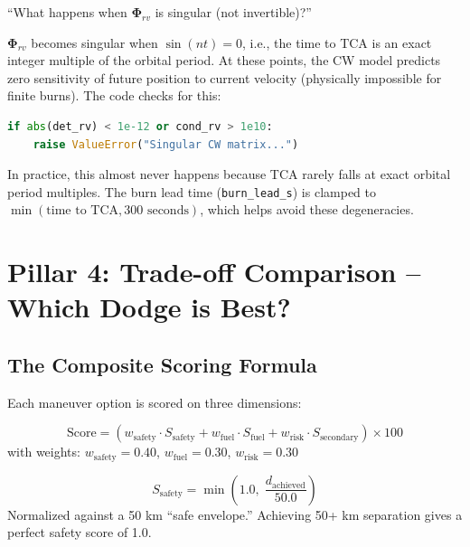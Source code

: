 \documentclass[12pt,a4paper]{article}
\begin{document}
\begin{questionbox}
``What happens when $\boldsymbol{\Phi}_{rv}$ is singular (not invertible)?''
\end{questionbox}
\begin{answerbox}
$\boldsymbol{\Phi}_{rv}$ becomes singular when $\sin(nt) = 0$, i.e., the time to TCA is an exact integer multiple of the orbital period. At these points, the CW model predicts zero sensitivity of future position to current velocity (physically impossible for finite burns). The code checks for this:
\begin{lstlisting}[language=Python]
if abs(det_rv) < 1e-12 or cond_rv > 1e10:
    raise ValueError("Singular CW matrix...")
\end{lstlisting}
In practice, this almost never happens because TCA rarely falls at exact orbital period multiples. The burn lead time (\texttt{burn\_lead\_s}) is clamped to $\min(\text{time to TCA}, 300\text{ seconds})$, which helps avoid these degeneracies.
\end{answerbox}

\newpage
\section{Pillar 4: Trade-off Comparison -- Which Dodge is Best?}

\subsection{The Composite Scoring Formula}

Each maneuver option is scored on three dimensions:

\begin{formulabox}[title=Formula: Composite Trade-off Score]
\[
\text{Score} = \left(w_{\text{safety}} \cdot S_{\text{safety}} + w_{\text{fuel}} \cdot S_{\text{fuel}} + w_{\text{risk}} \cdot S_{\text{secondary}}\right) \times 100
\]
with weights: $w_{\text{safety}} = 0.40$, $w_{\text{fuel}} = 0.30$, $w_{\text{risk}} = 0.30$
\end{formulabox}

\begin{formulabox}[title=Formula: Safety Score]
\[
S_{\text{safety}} = \min\left(1.0,\; \frac{d_{\text{achieved}}}{50.0}\right)
\]
Normalized against a 50 km ``safe envelope.'' Achieving 50+ km separation gives a perfect safety score of 1.0.
\end{formulabox}
\end{document}
